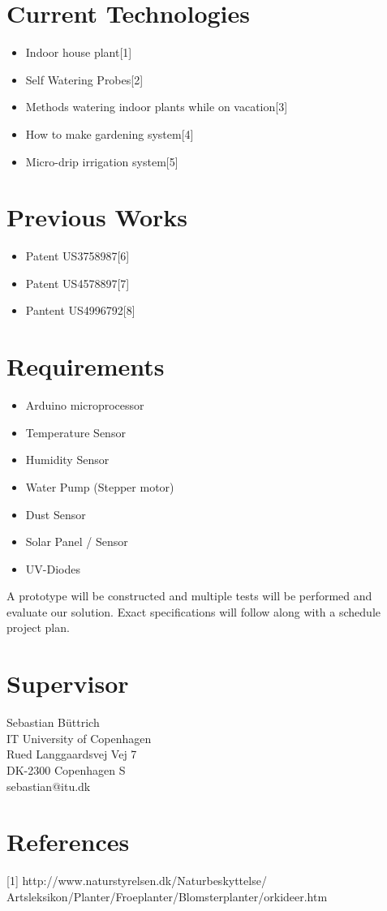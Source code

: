 \documentclass{ubicomp2012}
\begin{document}
\section{Current Technologies}
\begin{itemize}
\item Indoor house plant[1]
\item Self Watering Probes[2]	
 \item Methods watering indoor plants while on vacation[3]
\item How to make gardening system[4] 
\item Micro-drip irrigation system[5]
\end{itemize}

\section{Previous Works}
\begin{itemize}
\item Patent US3758987[6]
\item Patent US4578897[7]
\item Pantent US4996792[8]
\end{itemize}

\section{Requirements}
\begin{itemize}
\item Arduino microprocessor
\item Temperature Sensor
\item Humidity Sensor
\item Water Pump (Stepper motor)
\item Dust Sensor
\item Solar Panel / Sensor
\item UV-Diodes 
\end{itemize}

A prototype will be constructed and multiple tests will be performed and evaluate our solution. Exact specifications will follow along with a schedule project plan.

\section{Supervisor}
Sebastian B\"uttrich\\
IT University of Copenhagen\\
Rued Langgaardsvej Vej 7\\
DK-2300 Copenhagen S\\
sebastian@itu.dk

\section{References}
[1] http://www.naturstyrelsen.dk/Naturbeskyttelse/
Artsleksikon/Planter/Froeplanter/Blomsterplanter/orkideer.htm

\nocite{example-journal,example-abstracts,example-conference2}



\end{document}
